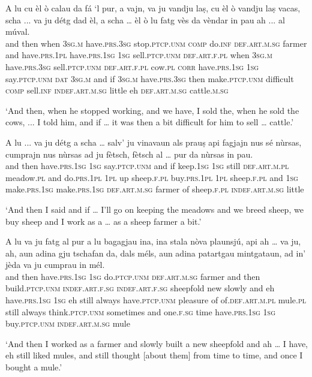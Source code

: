 \begin{linenumbers}
\gll  A lu cu èl ò calau da fá `l pur, a vajn, va ju vandju laṣ, cu èl ò vandju laṣ vacas, scha ... va ju détg dad èl, a scha … èl ò lu fatg vès da vèndar in pau ah ... al múval.\\
and then when \textsc{3sg.m} have.\textsc{prs.3sg} stop.\textsc{ptcp.unm} \textsc{comp} do.\textsc{inf} \textsc{def.art.m.sg} farmer and have.\textsc{prs.1pl} have.\textsc{prs.1sg} \textsc{1sg} sell.\textsc{ptcp.unm}  \textsc{def.art.f.pl} when \textsc{3sg.m} have.\textsc{prs.3sg} sell.\textsc{ptcp.unm} \textsc{def.art.f.pl} cow.\textsc{pl} \textsc{corr} {} have.\textsc{prs.1sg} \textsc{1sg} say.\textsc{ptcp.unm} \textsc{dat} \textsc{3sg.m} and if {} \textsc{3sg.m} have.\textsc{prs.3sg} then make.\textsc{ptcp.unm} difficult \textsc{comp} sell.\textsc{inf} \textsc{indef.art.m.sg} little eh {} \textsc{def.art.m.sg} cattle.\textsc{m.sg} \\
\end{linenumbers} 
\medskip
\glt `And then, when he stopped working, and we have, I sold the, when he sold the cows, ... I told him, and if … it was then a bit difficult for him to sell … cattle.'
\medskip

\begin{linenumbers}
\gll  A lu ... va ju détg a scha … salv’ ju vinavaun als prauṣ api fagjajn nus sé nùrsas, cumprajn nus nùrsas ad ju fètsch, fètsch al … pur da nùrsas in pau.\\
and then {} have.\textsc{prs.1sg} \textsc{1sg} say.\textsc{ptcp.unm} and if {} keep.\textsc{1sg} \textsc{1sg} still \textsc{def.art.m.pl} meadow.\textsc{pl} and do.\textsc{prs.1pl} \textsc{1pl} up sheep.\textsc{f.pl} buy.\textsc{prs.1pl} \textsc{1pl} sheep.\textsc{f.pl} and \textsc{1sg} make.\textsc{prs.1sg} make.\textsc{prs.1sg} \textsc{def.art.m.sg} {} farmer of sheep.\textsc{f.pl} \textsc{indef.art.m.sg} little\\
\end{linenumbers}
\medskip
\glt `And then I said and if …  I'll go on keeping the meadows and we breed sheep, we buy sheep and I work as a … as a sheep farmer a bit.'
\medskip

\begin{linenumbers}
\gll A lu va ju fatg al pur a lu bagagjau ina, ina stala nòva plaunsjú, api ah … va ju, ah, aun adina gju tschafan da, dals méls, aun adina patartgau mintgataun, ad in’ jèda va ju cumprau in mél. \\
and then have.\textsc{prs.1sg} \textsc{1sg} do.\textsc{ptcp.unm} \textsc{def.art.m.sg} farmer and then build.\textsc{ptcp.unm} \textsc{indef.art.f.sg} \textsc{indef.art.f.sg} sheepfold new slowly and eh {} have.\textsc{prs.1sg} \textsc{1sg} eh still always have.\textsc{ptcp.unm} pleasure of  of.\textsc{def.art.m.pl} mule.\textsc{pl} still always think.\textsc{ptcp.unm} sometimes and one.\textsc{f.sg} time have.\textsc{prs.1sg} \textsc{1sg}  buy.\textsc{ptcp.unm} \textsc{indef.art.m.sg} mule \\
\end{linenumbers}
\medskip
\glt `And then I worked as a farmer and slowly built a new sheepfold and ah … I have, eh still liked mules, and still thought [about them] from time to time, and once I bought a mule.'
\medskip

